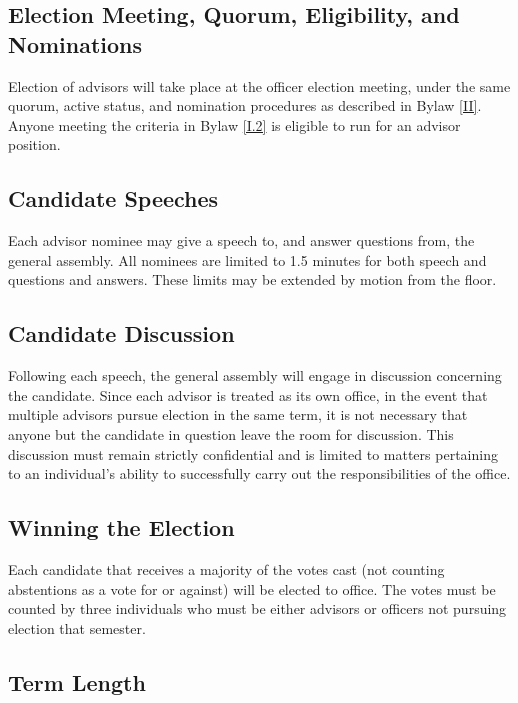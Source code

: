 \subsection{Election Meeting, Quorum, Eligibility, and Nominations} \label{III.1}

Election
of advisors will take place at the officer election meeting, under the same quorum,
active status, and nomination procedures as described in Bylaw \ref{II}. Anyone meeting the
criteria in Bylaw \ref{I.2} is eligible to run for an advisor position.


\subsection{Candidate Speeches} \label{III.2}

Each advisor nominee may give a speech to, and
answer questions from, the general assembly. All nominees are limited to 1.5 minutes for
both speech and questions and answers. These limits may be extended by motion from the
floor.


\subsection{Candidate Discussion} \label{III.3}

Following each speech, the general assembly
will engage in discussion concerning the candidate. Since each advisor is treated as its
own office, in the event that multiple advisors pursue election in the same term, it is not
necessary that anyone but the candidate in question leave the room for discussion. This
discussion must remain strictly confidential and is limited to matters pertaining to an individual’s
ability to successfully carry out the responsibilities of the office.


\subsection{Winning the Election} \label{III.4}

Each candidate that receives a majority of the
votes cast (not counting abstentions as a vote for or against) will be elected to office. The
votes must be counted by three individuals who must be either advisors or officers not
pursuing election that semester.


\subsection{Term Length} \label{III.5}

